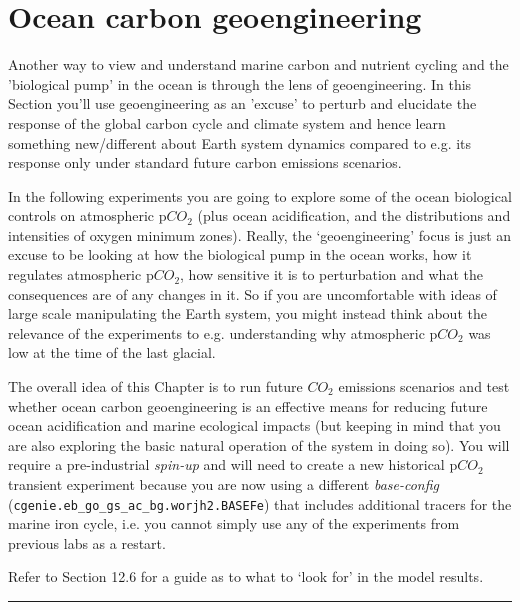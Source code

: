 \documentclass[11pt,fleqn]{book} %
\begin{document}
\newpage


\section{Ocean carbon geoengineering}

\noindent Another way to view and understand marine carbon and nutrient cycling and the 'biological pump' in the ocean is through the lens of geoengineering. In this Section you'll use geoengineering as an 'excuse' to perturb and elucidate the response of the global carbon cycle and climate system and hence learn something new/different about Earth system dynamics compared to e.g. its response only under standard future carbon emissions scenarios.

In the following experiments you are going to explore some of the ocean biological controls on atmospheric p\(CO_{2}\) (plus ocean acidification, and the distributions and intensities of oxygen minimum zones). Really, the ‘geoengineering’ focus is just an excuse to be looking at how the biological pump in the ocean works, how it regulates atmospheric p\(CO_{2}\), how sensitive it is to perturbation and what the consequences are of any changes in it. So if you are uncomfortable with ideas of large scale manipulating the Earth system, you might instead think about the relevance of the experiments to e.g. understanding why atmospheric p\(CO_{2}\) was low at the time of the last glacial.

The overall idea of this Chapter is to run future \(CO_{2}\) emissions scenarios and test whether ocean carbon geoengineering is an effective means for reducing future ocean acidification and marine ecological impacts (but keeping in mind that you are also exploring the basic natural operation of the system in doing so). You will require a pre-industrial \textit{spin-up} and will need to create a new historical p\(CO_{2}\) transient experiment because you are now using a different \textit{base-config} (\texttt{cgenie.eb\_go\_gs\_ac\_bg.worjh2.BASEFe}) that includes additional tracers for the marine iron cycle, i.e. you cannot simply use any of the experiments from previous labs as a restart.

Refer to Section 12.6  for a guide as to what to ‘look for’ in the model results.

\vspace{1mm}
\noindent\rule{4cm}{0.1mm}
\vspace{2mm}
\end{document}
